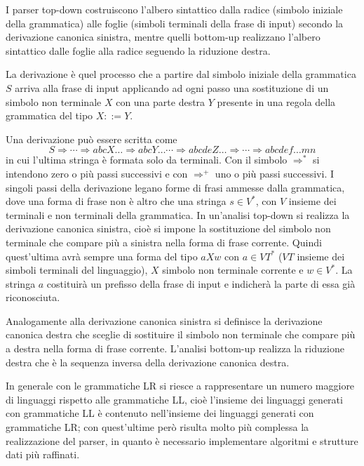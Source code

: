 I parser top-down costruiscono l'albero sintattico dalla radice (simbolo
iniziale della grammatica) alle foglie (simboli terminali della frase di
input) secondo la derivazione canonica sinistra, mentre quelli bottom-up
realizzano l'albero sintattico dalle foglie alla radice seguendo la riduzione
destra. 

La derivazione è quel processo che a partire dal simbolo iniziale della
grammatica $S$ arriva alla frase di input applicando ad ogni passo una
sostituzione di un simbolo non terminale $X$ con una parte destra $Y$ presente in
una regola della grammatica del tipo $X ::= Y$. 

Una derivazione può essere scritta come 
$$ S \Rightarrow \cdots \Rightarrow
abcX\ldots \Rightarrow abcY\ldots \cdots \Rightarrow abcdeZ\ldots \Rightarrow
\cdots \Rightarrow abcdef\ldots mn $$ 
in cui l'ultima stringa è formata solo da
terminali. Con il simbolo $ \Rightarrow^*$ si intendono zero o più passi
successivi e con $\Rightarrow^+$ uno o più passi successivi. I singoli passi
della derivazione legano forme di frasi ammesse dalla grammatica, dove una forma
di frase non è altro che una stringa $s \in V^*$, con $V$ insieme dei terminali e
non terminali della grammatica. In un'analisi top-down si realizza la
derivazione canonica sinistra, cioè si impone la sostituzione del simbolo
non terminale che compare più a sinistra nella forma di frase corrente. Quindi
quest'ultima avrà sempre una forma del tipo $aXw$ con $a \in VT^*$ ($VT$ insieme
dei simboli terminali del linguaggio), $X$ simbolo non terminale corrente e $w
\in V^*$. La stringa $a$ costituirà un prefisso della frase di input e
indicherà la parte di essa già riconosciuta. 

Analogamente alla derivazione canonica sinistra si definisce la derivazione
canonica destra che sceglie di sostituire il simbolo non terminale che
compare più a destra nella forma di frase corrente. L'analisi bottom-up realizza
la riduzione destra che è la sequenza inversa della derivazione canonica destra.

In generale con le grammatiche LR si riesce a rappresentare un numero
maggiore di linguaggi rispetto alle grammatiche LL, cioè l'insieme dei
linguaggi generati con grammatiche LL è contenuto nell'insieme dei linguaggi
generati con grammatiche LR; con quest'ultime però risulta molto più complessa
la realizzazione del parser, in quanto è necessario implementare algoritmi e
strutture dati più raffinati.

